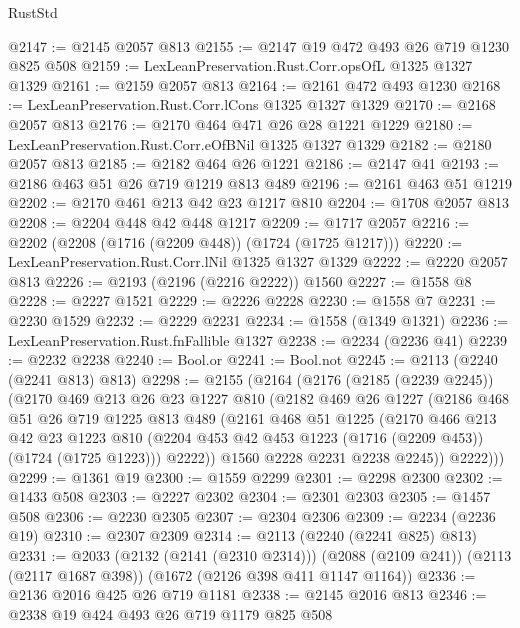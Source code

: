 \begin{lexlean}{RustStd}
\begin{coremodule}
@2147 := @2145 @2057 @813
@2155 := @2147 @19 @472 @493 @26 @719 @1230 @825 @508
@2159 := LexLeanPreservation.Rust.Corr.opsOfL @1325 @1327 @1329
@2161 := @2159 @2057 @813
@2164 := @2161 @472 @493 @1230
@2168 := LexLeanPreservation.Rust.Corr.lCons @1325 @1327 @1329
@2170 := @2168 @2057 @813
@2176 := @2170 @464 @471 @26 @28 @1221 @1229
@2180 := LexLeanPreservation.Rust.Corr.eOfBNil @1325 @1327 @1329
@2182 := @2180 @2057 @813
@2185 := @2182 @464 @26 @1221
@2186 := @2147 @41
@2193 := @2186 @463 @51 @26 @719 @1219 @813 @489
@2196 := @2161 @463 @51 @1219
@2202 := @2170 @461 @213 @42 @23 @1217 @810
@2204 := @1708 @2057 @813
@2208 := @2204 @448 @42 @448 @1217
@2209 := @1717 @2057
@2216 := @2202 (@2208 (@1716 (@2209 @448)) (@1724 (@1725 @1217)))
@2220 := LexLeanPreservation.Rust.Corr.lNil @1325 @1327 @1329
@2222 := @2220 @2057 @813
@2226 := @2193 (@2196 (@2216 @2222)) @1560
@2227 := @1558 @8
@2228 := @2227 @1521
@2229 := @2226 @2228
@2230 := @1558 @7
@2231 := @2230 @1529
@2232 := @2229 @2231
@2234 := @1558 (@1349 @1321)
@2236 := LexLeanPreservation.Rust.fnFallible @1327
@2238 := @2234 (@2236 @41)
@2239 := @2232 @2238
@2240 := Bool.or
@2241 := Bool.not
@2245 := @2113 (@2240 (@2241 @813) @813)
@2298 := @2155
    (@2164
      (@2176
        (@2185 (@2239 @2245))
        (@2170
          @469
          @213
          @26
          @23
          @1227
          @810
          (@2182
            @469
            @26
            @1227
            (@2186
              @468
              @51
              @26
              @719
              @1225
              @813
              @489
              (@2161
                @468
                @51
                @1225
                (@2170
                  @466
                  @213
                  @42
                  @23
                  @1223
                  @810
                  (@2204 @453 @42 @453 @1223 (@1716 (@2209 @453)) (@1724 (@1725 @1223)))
                  @2222))
              @1560
              @2228
              @2231
              @2238
              @2245))
          @2222)))
@2299 := @1361 @19
@2300 := @1559 @2299
@2301 := @2298 @2300
@2302 := @1433 @508
@2303 := @2227 @2302
@2304 := @2301 @2303
@2305 := @1457 @508
@2306 := @2230 @2305
@2307 := @2304 @2306
@2309 := @2234 (@2236 @19)
@2310 := @2307 @2309
@2314 := @2113 (@2240 (@2241 @825) @813)
@2331 := @2033
    (@2132 (@2141 (@2310 @2314)))
    (@2088 (@2109 @241))
    (@2113 (@2117 @1687 @398))
    (@1672 (@2126 @398 @411 @1147 @1164))
@2336 := @2136 @2016 @425 @26 @719 @1181
@2338 := @2145 @2016 @813
@2346 := @2338 @19 @424 @493 @26 @719 @1179 @825 @508

\end{coremodule}
\end{lexlean}
